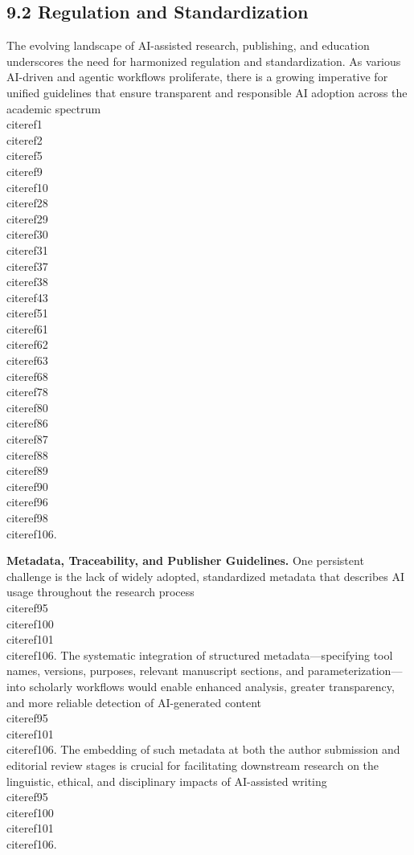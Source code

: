 \documentclass[11pt]{article}
\begin{document}
\subsection{9.2 Regulation and Standardization}

The evolving landscape of AI-assisted research, publishing, and education underscores the need for harmonized regulation and standardization. As various AI-driven and agentic workflows proliferate, there is a growing imperative for unified guidelines that ensure transparent and responsible AI adoption across the academic spectrum \\cite{ref1}\\cite{ref2}\\cite{ref5}\\cite{ref9}\\cite{ref10}\\cite{ref28}\\cite{ref29}\\cite{ref30}\\cite{ref31}\\cite{ref37}\\cite{ref38}\\cite{ref43}\\cite{ref51}\\cite{ref61}\\cite{ref62}\\cite{ref63}\\cite{ref68}\\cite{ref78}\\cite{ref80}\\cite{ref86}\\cite{ref87}\\cite{ref88}\\cite{ref89}\\cite{ref90}\\cite{ref96}\\cite{ref98}\\cite{ref106}.

\textbf{Metadata, Traceability, and Publisher Guidelines.}  
One persistent challenge is the lack of widely adopted, standardized metadata that describes AI usage throughout the research process \\cite{ref95}\\cite{ref100}\\cite{ref101}\\cite{ref106}. The systematic integration of structured metadata—specifying tool names, versions, purposes, relevant manuscript sections, and parameterization—into scholarly workflows would enable enhanced analysis, greater transparency, and more reliable detection of AI-generated content \\cite{ref95}\\cite{ref101}\\cite{ref106}. The embedding of such metadata at both the author submission and editorial review stages is crucial for facilitating downstream research on the linguistic, ethical, and disciplinary impacts of AI-assisted writing \\cite{ref95}\\cite{ref100}\\cite{ref101}\\cite{ref106}.
\end{document}
